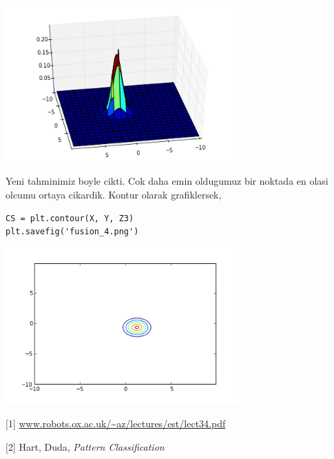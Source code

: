 \documentclass[12pt,fleqn]{article}\usepackage{../common}
\begin{document}
\includegraphics[height=6cm]{fusion_2.png}

Yeni tahminimiz boyle cikti. Cok daha emin oldugumuz bir noktada en olasi
olcumu ortaya cikardik. Kontur olarak grafiklersek,

\begin{verbatim}
CS = plt.contour(X, Y, Z3)
plt.savefig('fusion_4.png')
\end{verbatim}

\includegraphics[height=6cm]{fusion_4.png}


[1] \url{www.robots.ox.ac.uk/~az/lectures/est/lect34.pdf}

[2] Hart, Duda, {\em Pattern Classification}
\end{document}
